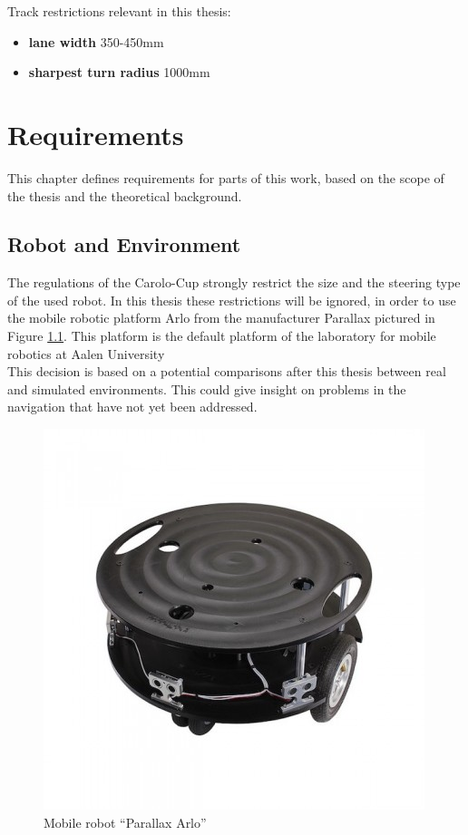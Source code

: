 Track restrictions relevant in this thesis:
\begin{itemize}
	\item \textbf{lane width} 350-450mm
	\item \textbf{sharpest turn radius} 1000mm
\end{itemize}











\chapter{Requirements}
\label{requirements}

This chapter defines requirements for parts of this work, based on the scope of the thesis and the theoretical background.

\section{Robot and Environment}

The regulations of the Carolo-Cup strongly restrict the size and the steering type of the used robot. In this thesis these restrictions will be ignored, in order to use the mobile robotic platform Arlo from the manufacturer Parallax pictured in Figure \ref{arlore}. This platform is the default platform of the laboratory for mobile robotics at Aalen University\\

This decision is based on a potential comparisons after this thesis between real and simulated environments. This could give insight on problems in the navigation that have not yet been addressed.\\


\begin{figure} 
	\centering
	\includegraphics[width=.7\textwidth]{arlo real}
	
	\caption{Mobile robot ``Parallax Arlo'' \cite{arloreal}}
	\label{arlore}
\end{figure}

